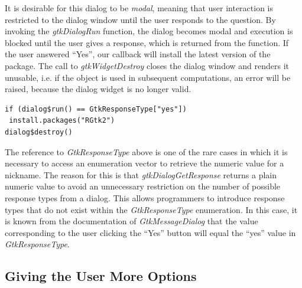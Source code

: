 \documentclass[article]{jss}
\begin{document}
It is desirable for this dialog to be \emph{modal}, meaning that user interaction
is restricted to the dialog window until the user responds to the
question. By invoking the \emph{gtkDialogRun} function, the dialog
becomes modal and execution is blocked until the user gives a
response, which is returned from the function.  If the user answered
``Yes'', our callback will install the latest version of the
 package. The call to \emph{gtkWidgetDestroy} closes the
dialog window and renders it unusable, i.e. if the object is used in
subsequent computations, an error will be raised, because the dialog
widget is no longer valid.
\begin{verbatim}
if (dialog$run() == GtkResponseType["yes"])
 install.packages("RGtk2")
dialog$destroy()
\end{verbatim}
The reference to \emph{GtkResponseType} above is one of the rare cases
in which it is necessary to access an enumeration vector to retrieve
the numeric value for a nickname. The reason for this is that
\emph{gtkDialogGetResponse} returns a plain numeric value to avoid an
unnecessary restriction on the number of possible response types from
a dialog. This allows programmers to introduce response types that do not exist within the \emph{GtkResponseType} enumeration.
In this case, it is known from the documentation of
\emph{GtkMessageDialog} that the value corresponding to the user
clicking the ``Yes'' button will equal the ``yes'' value in
\emph{GtkResponseType}.

\subsection{Giving the User More Options}

\end{document}

